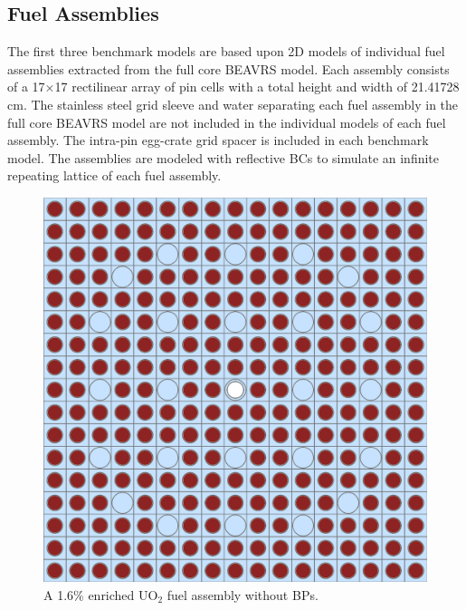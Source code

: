 \subsection{Fuel Assemblies}
\label{subsec:chap7-fuel-assms}

The first three benchmark models are based upon 2D models of individual fuel assemblies extracted from the full core \ac{BEAVRS} model. Each assembly consists of a 17$\times$17 rectilinear array of pin cells with a total height and width of 21.41728 cm. The stainless steel grid sleeve and water separating each fuel assembly in the full core \ac{BEAVRS} model are not included in the individual models of each fuel assembly. The intra-pin egg-crate grid spacer is included in each benchmark model. The assemblies are modeled with reflective \acp{BC} to simulate an infinite repeating lattice of each fuel assembly. 

\begin{figure}[h!]
  \centering
  \includegraphics[width=0.65\linewidth]{figures/benchmarks/assembly-16}
\vspace{2mm}
\caption[BEAVRS 1.6\% enriched assembly]{A 1.6\% enriched UO$_2$ fuel assembly without \acp{BP}.}
\label{fig:chap7-assm-16}
\end{figure}

